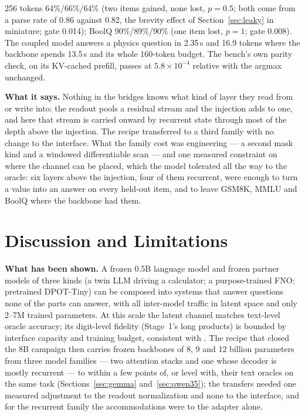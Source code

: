 \documentclass[11pt]{article}
\begin{document}
256 tokens 64\%/66\%/64\% (two items gained, none lost, $p = 0.5$; both come from a parse rate of 0.86 against 0.82, the brevity effect of Section~\ref{sec:leaky} in miniature; gate 0.014); BoolQ 90\%/89\%/90\% (one item lost, $p = 1$; gate 0.008). The coupled model answers a physics question in 2.35\,s and 16.9 tokens where the backbone spends 13.5\,s and its whole 160-token budget. The bench's own parity check, on its KV-cached prefill, passes at $5.8\times10^{-4}$ relative with the argmax unchanged.

\textbf{What it says.} Nothing in the bridges knows what kind of layer they read from or write into: the readout pools a residual stream and the injection adds to one, and here that stream is carried onward by recurrent state through most of the depth above the injection. The recipe transferred to a third family with no change to the interface. What the family cost was engineering --- a second mask kind and a windowed differentiable scan --- and one measured constraint on where the channel can be placed, which the model tolerated all the way to the oracle: six layers above the injection, four of them recurrent, were enough to turn a value into an answer on every held-out item, and to leave GSM8K, MMLU and BoolQ where the backbone had them.

\section{Discussion and Limitations}
\label{sec:discussion}

\textbf{What has been shown.} A frozen 0.5B language model and frozen partner models of three kinds (a twin LLM driving a calculator; a purpose-trained FNO; pretrained DPOT-Tiny) can be composed into systems that answer questions none of the parts can answer, with all inter-model traffic in latent space and only 2--7M trained parameters. At this scale the latent channel matches text-level oracle accuracy; its digit-level fidelity (Stage~1's long products) is bounded by interface capacity and training budget, consistent with \citet{flamant2026bicameral}. The recipe that closed the 8B campaign then carries frozen backbones of 8, 9 and 12 billion parameters from three model families --- two attention stacks and one whose decoder is mostly recurrent --- to within a few points of, or level with, their text oracles on the same task (Sections~\ref{sec:gemma} and~\ref{sec:qwen35}); the transfers needed one measured adjustment to the readout normalization and none to the interface, and for the recurrent family the accommodations were to the adapter alone.
\end{document}
